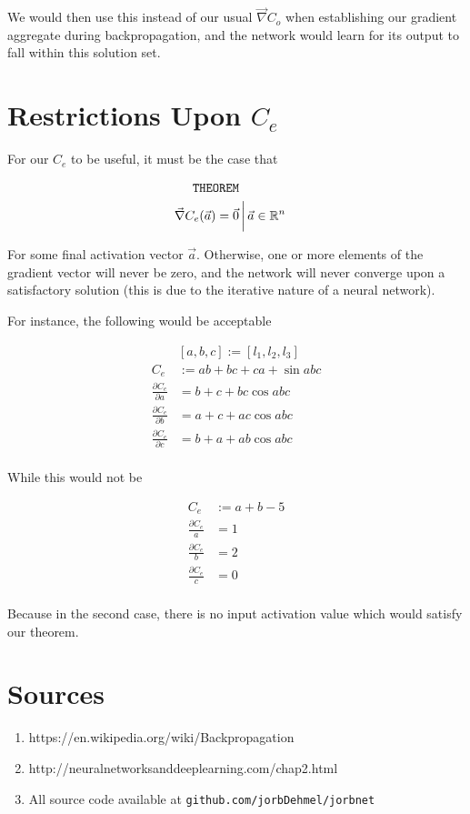 \documentclass[8pt]{amsart}
\newcommand\where{\, \bigg \rvert \,}
\begin{document}
We would then use this instead of our usual $\vec{\nabla} C_o$ when establishing
our gradient aggregate during backpropagation, and the network would learn for its
output to fall within this solution set.

\section{Restrictions Upon $C_e$}

For our $C_e$ to be useful, it must be the case that

\[
\begin{aligned}
    \verb|THEOREM| \\
    \vec{\nabla} C_e (\vec{a}) = \vec{0} &\where \vec{a} \in \mathbb{R}^n
\end{aligned}
\]

For some final activation vector $\vec{a}$. Otherwise, one or more elements of 
the gradient vector will never be zero, and the network will never converge upon
a satisfactory solution (this is due to the iterative nature of a neural network).

For instance, the following would be acceptable

\[
\begin{aligned}
    &\left[ a, b, c \right] := \left[ l_1, l_2, l_3 \right] \\
    C_e &:= ab + bc + ca + \sin{abc} \\
    \frac{\partial C_e}{\partial a} &= b + c + bc \cos{abc} \\
    \frac{\partial C_e}{\partial b} &= a + c + ac \cos{abc} \\
    \frac{\partial C_e}{\partial c} &= b + a + ab \cos{abc} \\
\end{aligned}
\]

While this would not be

\[
\begin{aligned}
    C_e &:= a + b - 5 \\
    \frac{\partial C_e}{a} &= 1 \\
    \frac{\partial C_e}{b} &= 2 \\
    \frac{\partial C_e}{c} &= 0 \\
\end{aligned}
\]

Because in the second case, there is no input activation value which
would satisfy our theorem.

\section{Sources}

\begin{enumerate}
    \item{https://en.wikipedia.org/wiki/Backpropagation}
    \item{http://neuralnetworksanddeeplearning.com/chap2.html}
    \item{All source code available at \verb|github.com/jorbDehmel/jorbnet|}
\end{enumerate}
\end{document}
